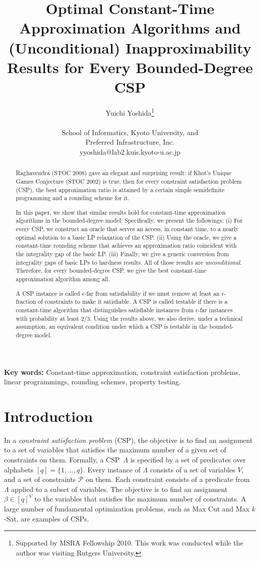 \documentclass[letterpaper, 11pt]{article}
\title{Optimal Constant-Time Approximation Algorithms and (Unconditional) Inapproximability Results for Every Bounded-Degree CSP}
\author{Yuichi Yoshida\thanks{Supported by MSRA Fellowship 2010. This work was conducted while the author was visiting Rutgers University. }\\\\
  School of Informatics, Kyoto University, and\\ Preferred Infrastructure, Inc.\\yyoshida@lab2.kuis.kyoto-u.ac.jp}
\date{}
\newcommand{\calP}{\mathcal{P}}
\begin{document}
\setcounter{page}{0}
\maketitle
\begin{abstract}
  Raghavendra (STOC 2008) gave an elegant and surprising result:
  if Khot's Unique Games Conjecture (STOC 2002) is true, 
  then for every constraint satisfaction problem (CSP), 
  the best approximation ratio is attained by a certain simple semidefinite programming and a rounding scheme for it.

  In this paper, 
  we show that similar results hold for constant-time approximation algorithms in the bounded-degree model.
  Specifically, we present the followings:
  (i) For every CSP, we construct an oracle that serves an access, 
  in constant time,
  to a nearly optimal solution to a basic LP relaxation of the CSP.
  (ii) Using the oracle, 
  we give a constant-time rounding scheme that achieves an approximation ratio coincident with the integrality gap of the basic LP.
  (iii) Finally, we give a generic conversion from integrality gaps of basic LPs to hardness results.
  All of those results are \textit{unconditional}.
  Therefore, for every bounded-degree CSP, 
  we give the best constant-time approximation algorithm among all.

  A CSP instance is called $\epsilon$-far from satisfiability if we must remove at least an $\epsilon$-fraction of constraints to make it satisfiable.
  A CSP is called testable if there is a constant-time algorithm that distinguishes satisfiable instances from $\epsilon$-far instances with probability at least $2/3$.
  Using the results above, 
  we also derive, under a technical assumption,
  an equivalent condition under which a CSP is testable in the bounded-degree model.
  \end{abstract}

{\bf Key words:} Constant-time approximation, constraint satisfaction problems, linear programmings, rounding schemes, property testing.
\newpage

\section{Introduction}
In a \textit{constraint satisfaction problem} (CSP), 
the objective is to find an assignment to a set of variables that satisfies the maximum number of a given set of constraints on them.
Formally, a CSP~$\Lambda$ is specified by a set of predicates over alphabets $[q]=\{1,\ldots,q\}$.
Every instance of $\Lambda$ consists of a set of variables $V$,
and a set of constraints $\calP$ on them.
Each constraint consists of a predicate from $\Lambda$ applied to a subset of variables.
The objective is to find an assignment $\beta \in [q]^V$ to the variables that satisfies the maximum number of constraints. 
A large number of fundamental optimization problems,
such as \textsf{Max Cut} and \textsf{Max $k$-Sat},
are examples of CSPs.
\end{document}
